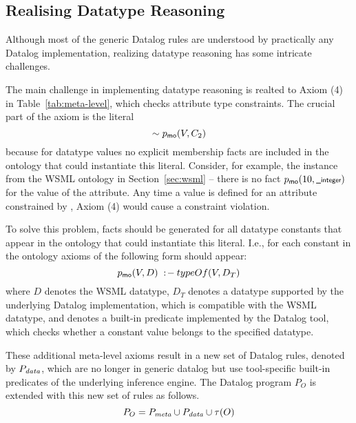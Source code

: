 \def\dataaxioms{\ensuremath{P_{\smtxtit{data}}}\xspace}
\def\transdpred{\transtxt{dpred}}

\subsection{Realising Datatype Reasoning}
\label{sec:datatype_reasoning} Although most of the generic
Datalog rules are understood by practically any Datalog
implementation, realizing datatype reasoning has some intricate
challenges.

The main challenge in implementing datatype reasoning is realted
to Axiom (4) in Table~\ref{tab:meta-level}, which checks attribute
type constraints. The crucial part of the axiom is the literal
\[\sim p_{\mathrm{\sf mo}}(V,C_2)\] because for datatype values no explicit
membership facts are included in the ontology that could
instantiate this literal. Consider, for example, the instance
 from the WSML ontology in Section~\ref{sec:wsml}
-- there is no fact $p_{\mathrm{\sf mo}}(10,\textsf{\scriptsize \_integer})$ for the value of
the  attribute. Any time a value is defined
for an attribute constrained by , Axiom (4) would
cause a constraint violation.

To solve this problem, \pmo facts should be generated for all
datatype constants that appear in the ontology that could
instantiate this literal. I.e., for each constant in the ontology
axioms of the following form should appear:
\begin{displaymath}
    p_{\mathrm{\sf mo}}(V,D) \;:\!-\: typeOf(V, D_T)
\end{displaymath}
where $D$ denotes the WSML datatype, $D_T$ denotes a datatype
supported by the underlying Datalog implementation, which is
compatible with the WSML datatype, and \typeof denotes a built-in
predicate implemented by the Datalog tool, which checks whether a
constant value belongs to the specified datatype.

These additional meta-level axioms result in a new set of Datalog
rules, denoted by \dataaxioms, which are no longer in generic
datalog but use tool-specific built-in predicates of the
underlying inference engine. The Datalog program $P_O$ is extended
with this new set of rules as follows.
\begin{displaymath}
    P_O = \mlaxioms \cup \dataaxioms \cup \tau(O)
\end{displaymath}


